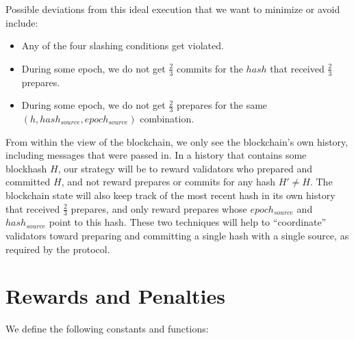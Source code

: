 \documentclass[12pt]{article}
\begin{document}
Possible deviations from this ideal execution that we want to minimize or avoid include:

\begin{itemize}
\item Any of the four slashing conditions get violated.
\item During some epoch, we do not get $\frac{2}{3}$ commits for the $hash$ that received $\frac{2}{3}$ prepares.
\item During some epoch, we do not get $\frac{2}{3}$ prepares for the same \\ $(h, hash_{source}, epoch_{source})$ combination.
\end{itemize}

From within the view of the blockchain, we only see the blockchain's own history, including messages that were passed in. In a history that contains some blockhash $H$, our strategy will be to reward validators who prepared and committed $H$, and not reward prepares or commits for any hash $H\prime \ne H$. The blockchain state will also keep track of the most recent hash in its own history that received $\frac{2}{3}$ prepares, and only reward prepares whose $epoch_{source}$ and $hash_{source}$ point to this hash. These two techniques will help to ``coordinate'' validators toward preparing and committing a single hash with a single source, as required by the protocol.

\section{Rewards and Penalties}

We define the following constants and functions:
\end{document}
